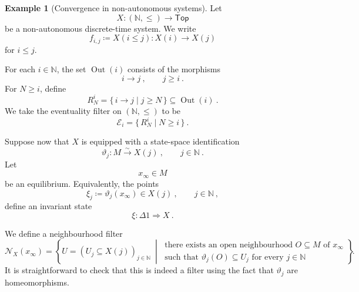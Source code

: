 \documentclass[a4paper,reqno,oneside]{amsart}
\theoremstyle{definition}
\newtheorem{example}[theorem]{Example}
\theoremstyle{remark}
\newcommand{\N}{\mathbb{N}}
\renewcommand{\theta}{\vartheta}
\numberwithin{equation}{section}
\begin{document}
	
	\begin{example}[Convergence in non-autonomous systems]\label{ex: convergence discrete non-auto}
		Let
		\begin{equation}
			X\colon(\N,\leq)\to\mathsf{Top}
		\end{equation}
		be a non-autonomous discrete-time system. We write
		\begin{equation}
			f_{i,j}\coloneqq X(i\leq j)\colon X(i)\to X(j)
		\end{equation}
		for $i\leq j$.
		
		For each $i\in\N$, the set $\operatorname{Out}(i)$ consists of the
		morphisms
		\begin{equation}
			i\to j \ ,
			\qquad j\geq i \ .
		\end{equation}
		For $N\geq i$, define
		\begin{equation}
			R_N^i
			=
			\{\,i\to j\mid j\geq N\,\}
			\subseteq \operatorname{Out}(i) \ .
		\end{equation}
		We take the eventuality filter on $(\N, \leq)$ to be
		\begin{equation}
			\mathcal E_i
			=
			\{\,R_N^i\mid N\geq i\,\} \ .
		\end{equation}
		
		Suppose now that $X$ is equipped with a state-space identification
		\begin{equation}
			\theta_j\colon M\xrightarrow{\sim}X(j) \ ,
			\qquad j\in\N \ .
		\end{equation}
		Let
		\begin{equation}
			x_\infty\in M
		\end{equation}
		be an equilibrium. Equivalently, the points
		\begin{equation}
			\xi_j\coloneqq \theta_j(x_\infty)\in X(j) \ ,
			\qquad j\in\N \ ,
		\end{equation}
		define an invariant state
		\begin{equation}
			\xi\colon \Delta 1\Longrightarrow X \ .
		\end{equation}
		
		We define a neighbourhood filter
		\begin{equation}
			\mathcal N_X(x_\infty)
			=
			\left\{
			U=(U_j\subseteq X(j))_{j\in\N}
			\ \middle|\
			\begin{array}{l}
				\text{there exists an open neighbourhood }O\subseteq M
				\text{ of }x_\infty\\
				\text{such that }\theta_j(O)\subseteq U_j
				\text{ for every }j\in\N
			\end{array}
			\right\} \ .
		\end{equation}
		It is straightforward to check that this is indeed a filter using the fact that $\theta_j$ are homeomorphisms.
		

\end{example}
\end{document}
